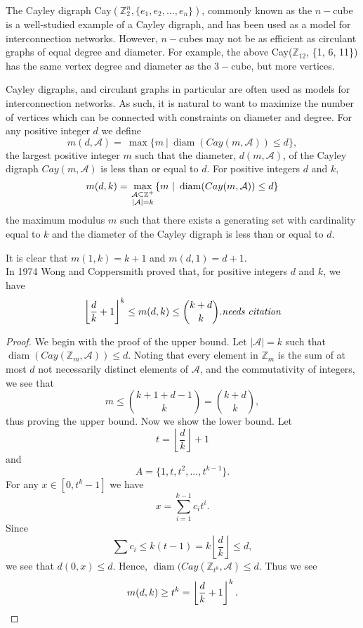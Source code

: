 \documentclass[11pt]{article}
\theoremstyle{definition}
\def\Z{\mbox{$\mathbb Z$}}
\def\diam{\operatorname{diam}}
\begin{document}
The Cayley digraph Cay$(\Z_2^n, \{e_1, e_2, ... , e_n\})$, commonly known as the $n-$cube  is a well-studied example of a Cayley digraph, and has been used as a model for interconnection networks.  However, $n-$cubes may not be as efficient as circulant graphs of equal degree and diameter.  For example, the above Cay($\Z_{12}$, \{1, 6, 11\}) has the same vertex degree and diameter as the $3-$cube, but more vertices.

 Cayley digraphs, and circulant graphs in particular are often used as models for interconnection networks. As such, it is natural to want to maximize the number of vertices which can be connected with constraints on diameter and degree.
For any positive integer $d$ we define
\[
m(d,\mathcal{A}) =\ \max\{m \  \vert \  \diam(Cay(m,\mathcal{A})) \leq d\},
\]
the largest positive integer $m$ such that the diameter, $d(m,\mathcal{A})$, of the Cayley digraph $Cay(m,\mathcal{A})$ is less than or equal to $d$. For positive integers $d$ and $k$,
\[
m(d, k) = \max_{\scriptstyle \mathcal{A}\subseteq\mathbb Z^{+}\atop\scriptstyle |\mathcal{A}|=k}\{m\  |\  \diam(Cay(m,\mathcal{A})) \leq d\}
\]
the maximum modulus $m$ such that there exists a generating set with cardinality equal to $k$ and the diameter of the Cayley digraph is less than or equal to $d$. 

It is clear that $m(1,k) = k+1$ and $m(d,1) = d+1$.\\
In 1974 Wong and Coppersmith proved that, for positive integers $d$ and $k$, we have
\[
\left \lfloor \frac dk + 1 \right \rfloor^k \leq m(d, k) \leq  \binom{k + d}k . \emph{needs citation}
\]


\begin{proof}
We begin with the proof of the upper bound. Let $|\mathcal{A}| = k$ such that $\diam(Cay(\Z_m, \mathcal{A})) \leq d$. Noting that every element in $\Z_m$ is the sum of at most $d$ not necessarily distinct elements of $\mathcal{A}$, and the commutativity of integers,  we see that
\[m \leq \binom{k + 1 + d - 1}k = \binom{k + d}k,
\] thus proving the upper bound.
Now we show the lower bound. Let
\[t = \left \lfloor \frac{d}{k} \right \rfloor + 1\]
and 
\[A = \{1, t, t^2, ... , t^{k-1}\}.\]
For any $x \in [0, t^k -1]$ we have
\[x = \sum_{i=1}^{k - 1}c_it^i.\]
Since 
\[\sum c_i \leq k(t - 1) = k \left \lfloor \frac dk \right \rfloor  \leq d,\]
we see that $d(0, x) \leq d$. Hence, $\diam(Cay(\Z_{t^k}, \mathcal{A}) \leq d$. Thus we see
\[m(d, k) \geq t^k  = \left \lfloor \frac dk + 1 \right \rfloor^k. \qedhere\]



\end{proof}
\end{document}
